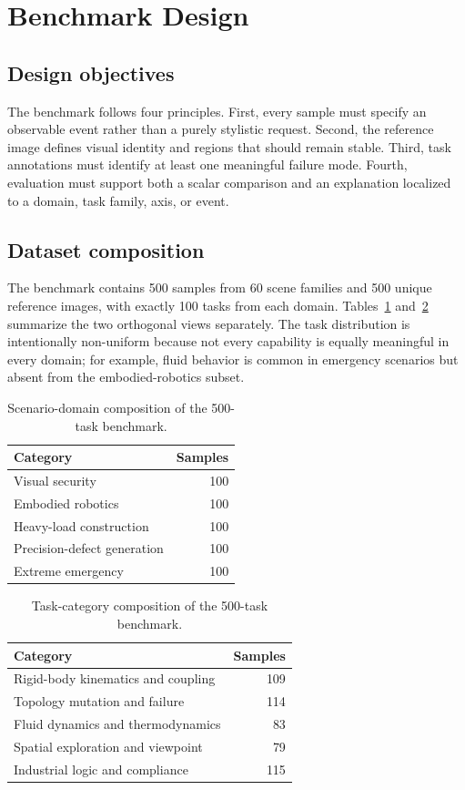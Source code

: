 \section{Benchmark Design}
\label{sec:benchmark}

\subsection{Design objectives}

The benchmark follows four principles. First, every sample must specify an observable event rather than a purely stylistic request. Second, the reference image defines visual identity and regions that should remain stable. Third, task annotations must identify at least one meaningful failure mode. Fourth, evaluation must support both a scalar comparison and an explanation localized to a domain, task family, axis, or event.

\subsection{Dataset composition}

The benchmark contains 500 samples from 60 scene families and 500 unique reference images, with exactly 100 tasks from each domain. Tables~\ref{tab:domain-stats} and~\ref{tab:task-stats} summarize the two orthogonal views separately. The task distribution is intentionally non-uniform because not every capability is equally meaningful in every domain; for example, fluid behavior is common in emergency scenarios but absent from the embodied-robotics subset.

\begin{table}[t]
\caption{Scenario-domain composition of the 500-task benchmark.}
\label{tab:domain-stats}
\begin{tabular}{lr}
\toprule
Category & Samples \\
\midrule
Visual security & 100 \\
Embodied robotics & 100 \\
Heavy-load construction & 100 \\
Precision-defect generation & 100 \\
Extreme emergency & 100 \\
\bottomrule
\end{tabular}
\end{table}

\begin{table}[t]
\caption{Task-category composition of the 500-task benchmark.}
\label{tab:task-stats}
\begin{tabular}{lr}
\toprule
Category & Samples \\
\midrule
Rigid-body kinematics and coupling & 109 \\
Topology mutation and failure & 114 \\
Fluid dynamics and thermodynamics & 83 \\
Spatial exploration and viewpoint & 79 \\
Industrial logic and compliance & 115 \\
\bottomrule
\end{tabular}
\end{table}

